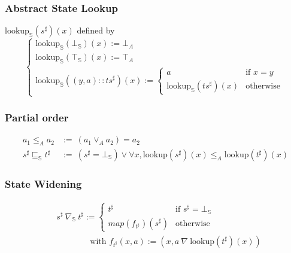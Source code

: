 \documentclass[aspectratio=169]{beamer}
\begin{document}
\begin{frame}
    \frametitle{Abstract State Lookup}
    \( \text{lookup}_\mathbb{S}(s^{\sharp}) (x)\) defined by
    \[
    \begin{cases}
        \text{lookup}_\mathbb{S}(\bot_\mathbb{S})(x) := \bot_A \\  
        \text{lookup}_\mathbb{S}(\top_\mathbb{S})(x) := \top_A \\
        \text{lookup}_\mathbb{S}((y, a) :: {ts}^{\sharp}) (x) := \begin{cases}
            a & \text{if } x = y \\
            \text{lookup}_\mathbb{S}(ts^{\sharp})(x) & \text{otherwise}
            \end{cases} 
        \end{cases}
    \]
\end{frame}























\begin{frame}
    \frametitle{Partial order}
    \begin{align*}
        a_1 \le_A a_2 &:=\ (a_1 \vee_A a_2) = a_2 \\
        s^{\sharp} \sqsubseteq_\mathbb{S} t^{\sharp} &:=\ (s^{\sharp} = \bot_\mathbb{S}) \vee \forall x, \text{lookup} (s^{\sharp}) (x) \le_A \text{lookup} (t^{\sharp}) (x)
    \end{align*}
\end{frame}



\begin{frame}
    \frametitle{State Widening}
    \begin{align*} 
        &s^{\sharp}\ \nabla_\mathbb{S}\ t^{\sharp} := \begin{cases}
                                                    t^{\sharp}       & \text{if } s^{\sharp} = \bot_\mathbb{S}\\
                                                    map (f_{t^{\sharp}}) (s^{\sharp}) & \text{otherwise}
                                                    \end{cases} \\
    & \qquad \qquad \text{with } f_{t^{\sharp}}(x, a) := (x, a\ \nabla\ \text{lookup} (t^{\sharp}) (x))
    \end{align*}
\end{frame}
\end{document}
